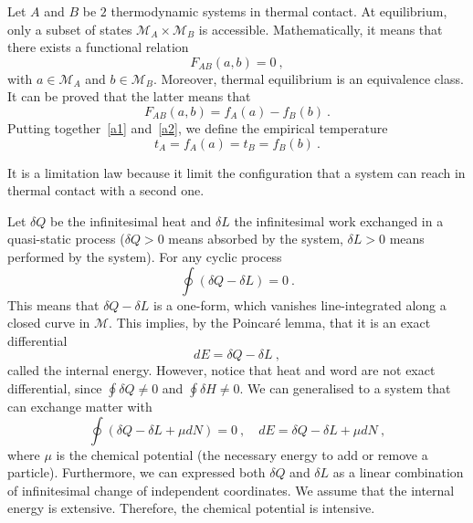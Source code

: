     \begin{law}[0th]
        Let $A$ and $B$ be $2$ thermodynamic systems in thermal contact. At equilibrium, only a subset of states $\mathcal M_A \times \mathcal M_B$ is accessible. Mathematically, it means that there exists a functional relation 
        \begin{equation}\label{a1}
            F_{AB} (a,b)= 0 ~,
        \end{equation}
        with $a \in \mathcal M_A$ and $b \in \mathcal M_B$. Moreover, thermal equilibrium is an equivalence class. It can be proved that the latter means that 
        \begin{equation}\label{a2}
            F_{AB} (a,b) = f_A(a) - f_B(b) ~.
        \end{equation}
        Putting together~\eqref{a1} and~\eqref{a2}, we define the empirical temperature 
        \begin{equation*}
            t_A = f_A(a) = t_B = f_B(b) ~.
        \end{equation*}
    \end{law}

    It is a limitation law because it limit the configuration that a system can reach in thermal contact with a second one. 

    \begin{law}[1st]
        Let $\delta Q$ be the infinitesimal heat and $\delta L$ the infinitesimal work exchanged in a quasi-static process ($\delta Q > 0$ means absorbed by the system, $\delta L > 0$ means performed by the system). For any cyclic process 
        \begin{equation*}
            \oint (\delta Q - \delta L) = 0 ~.
        \end{equation*}
        This means that $\delta Q - \delta L$ is a one-form, which vanishes line-integrated along a closed curve in $\mathcal M$. This implies, by the Poincaré lemma, that it is an exact differential 
        \begin{equation*}
            dE = \delta Q - \delta L ~,
        \end{equation*}
        called the internal energy. However, notice that heat and word are not exact differential, since $\oint \delta Q \neq 0$ and $\oint \delta H \neq 0$. We can generalised to a system that can exchange matter with 
        \begin{equation}\label{first}
            \oint (\delta Q - \delta L + \mu dN) = 0 ~, \quad dE = \delta Q - \delta L + \mu dN ~,
        \end{equation} 
        where $\mu$ is the chemical potential (the necessary energy to add or remove a particle). Furthermore, we can expressed both $\delta Q$ and $\delta L$ as a linear combination of infinitesimal change of independent coordinates. We assume that the internal energy is extensive. Therefore, the chemical potential is intensive.
    \end{law}

